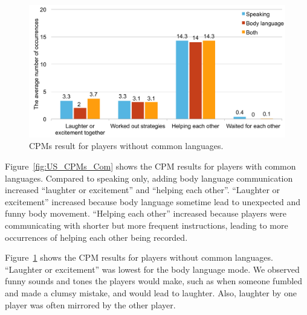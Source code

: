 \begin{figure}[!h]
\centering
\includegraphics[width=0.9\columnwidth]{Figures/US_CPMs_Dif.pdf}
\caption{CPMs result for players without common languages.}
\label{fig:US_CPMs_Dif}
\end{figure}

Figure~\ref{fig:US_CPMs_Com} shows the CPM results for players with common languages. Compared to speaking only, adding body language communication increased ``laughter or excitement'' and ``helping each other''. ``Laughter or excitement'' increased because body language sometime lead to unexpected and funny body movement. ``Helping each other'' increased because players were communicating with shorter but more frequent instructions, leading to more occurrences of helping each other being recorded. 

Figure~\ref{fig:US_CPMs_Dif} shows the CPM results for players without common languages. 
``Laughter or excitement'' was lowest for the body language mode.  We observed funny sounds and tones the players would make, such as when someone fumbled and made a clumsy mistake, and would lead to laughter. Also, laughter by one player was often mirrored by the other player. 


 

